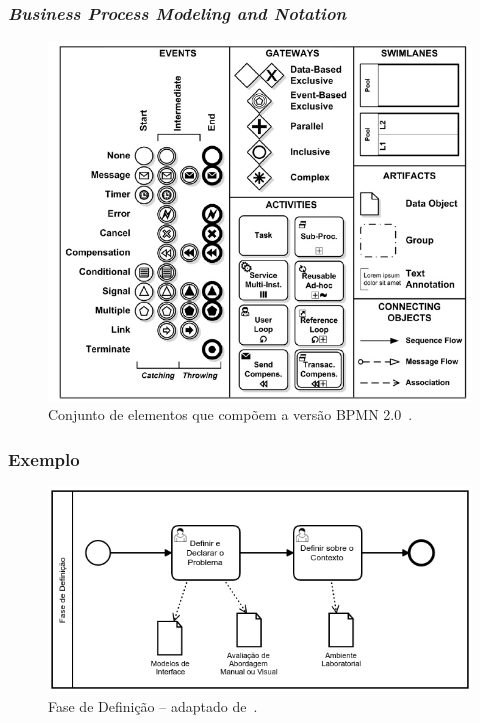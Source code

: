 \documentclass[aspectratio=169]{beamer}
\begin{document}
\begin{frame}
\frametitle{\textit{Business Process Modeling and Notation}}
\justifying

\begin{figure}
\centering
\includegraphics[scale=0.32]{images/elementos.png}
\caption{Conjunto de elementos que compõem a versão BPMN 2.0~\cite{OMG}.}
\label{image:bpmn}
\end{figure}

\end{frame}

\begin{frame}
\frametitle{Exemplo}
\justifying

\begin{figure}
\centering
\includegraphics[scale=0.32]{images/modelo-definicao.png}
\caption{Fase de Definição -- adaptado de~\cite{martins}.}
\label{image:fase-definicao}
\end{figure}


\end{frame}
\end{document}
